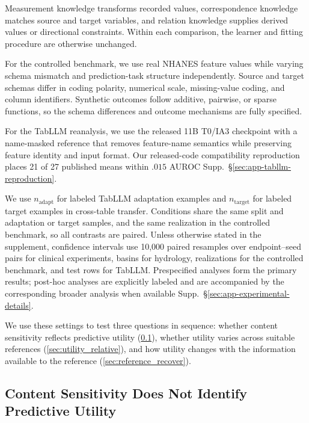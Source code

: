 \documentclass{article} %
\newcommand{\supp}[1]{\textnormal{Supp.~#1}}
\begin{document}
Measurement knowledge transforms recorded values, correspondence knowledge matches source and target variables, and relation knowledge supplies derived values or directional constraints.
Within each comparison, the learner and fitting procedure are otherwise unchanged.

For the controlled benchmark, we use real NHANES feature values while varying schema mismatch and prediction-task structure independently.
Source and target schemas differ in coding polarity, numerical scale, missing-value coding, and column identifiers.
Synthetic outcomes follow additive, pairwise, or sparse functions, so the schema differences and outcome mechanisms are fully specified.

For the TabLLM reanalysis, we use the released 11B T0/IA3 checkpoint with a name-masked reference that removes feature-name semantics while preserving feature identity and input format.
Our released-code compatibility reproduction places 21 of 27 published means within $.015$ AUROC \supp{\S\ref{sec:app-tabllm-reproduction}}.

We use $n_{\mathrm{adapt}}$ for labeled TabLLM adaptation examples and $n_{\mathrm{target}}$ for labeled target examples in cross-table transfer.
Conditions share the same split and adaptation or target samples, and the same realization in the controlled benchmark, so all contrasts are paired.
Unless otherwise stated in the supplement, confidence intervals use 10,000 paired resamples over endpoint--seed pairs for clinical experiments, basins for hydrology, realizations for the controlled benchmark, and test rows for TabLLM.
Prespecified analyses form the primary results; post-hoc analyses are explicitly labeled and are accompanied by the corresponding broader analysis when available \supp{\S\ref{sec:app-experimental-details}}.

We use these settings to test three questions in sequence: whether content sensitivity reflects predictive utility (\ref{sec:gap_composition}), whether utility varies across suitable references (\ref{sec:utility_relative}), and how utility changes with the information available to the reference (\ref{sec:reference_recover}).

\subsection{Content Sensitivity Does Not Identify Predictive Utility}
\label{sec:gap_composition}
\end{document}
